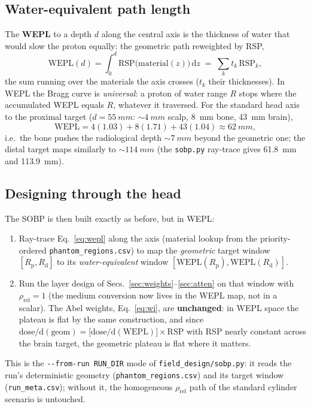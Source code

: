 \documentclass[11pt]{article}
\newcommand{\Rd}{R_{\mathrm d}}
\newcommand{\Rp}{R_{\mathrm p}}
\begin{document}
\subsection{Water-equivalent path length}
The \textbf{WEPL} to a depth $d$ along the central axis is the thickness of water
that would slow the proton equally: the geometric path reweighted by RSP,
\begin{equation}
\mathrm{WEPL}(d)=\int_0^{d}\mathrm{RSP}\big(\mathrm{material}(z)\big)\,\mathrm dz
\;=\;\sum_k t_k\,\mathrm{RSP}_k ,
\label{eq:wepl}
\end{equation}
the sum running over the materials the axis crosses ($t_k$ their thicknesses). In
WEPL the Bragg curve is \emph{universal}: a proton of water range $R$ stops where
the accumulated WEPL equals $R$, whatever it traversed. For the standard head axis
to the proximal target ($d=\SI{55}{mm}$: ${\sim}\SI{4}{mm}$ scalp, \SI{8}{mm}
bone, \SI{43}{mm} brain),
\[
\mathrm{WEPL}=4(1.03)+8(1.71)+43(1.04)\approx\SI{62}{mm},
\]
i.e.\ the bone pushes the radiological depth ${\sim}\SI{7}{mm}$ beyond the
geometric one; the distal target maps similarly to ${\sim}\SI{114}{mm}$ (the
\texttt{sobp.py} ray-trace gives \SI{61.8}{mm} and \SI{113.9}{mm}).

\subsection{Designing through the head}
The SOBP is then built exactly as before, but in WEPL:
\begin{enumerate}[nosep]
\item Ray-trace Eq.~\eqref{eq:wepl} along the axis (material lookup from the
priority-ordered \texttt{phantom\_regions.csv}) to map the \emph{geometric} target
window $[\Rp,\Rd]$ to its \emph{water-equivalent} window
$[\mathrm{WEPL}(\Rp),\mathrm{WEPL}(\Rd)]$.
\item Run the layer design of Secs.~\ref{sec:weights}--\ref{sec:atten} on that
window with $\rho_{\mathrm{rel}}=1$ (the medium conversion now lives in the WEPL
map, not in a scalar). The Abel weights, Eq.~\eqref{eq:wi}, are \textbf{unchanged}:
in WEPL space the plateau is flat by the same construction, and since
$\mathrm{dose}/\mathrm d(\text{geom})=\big[\mathrm{dose}/\mathrm d(\mathrm{WEPL})\big]
\times\mathrm{RSP}$ with RSP nearly constant across the brain target, the geometric
plateau is flat where it matters.
\end{enumerate}
This is the \texttt{-{}-from-run RUN\_DIR} mode of \texttt{field\_design/sobp.py}:
it reads the run's deterministic geometry (\texttt{phantom\_regions.csv}) and its
target window (\texttt{run\_meta.csv}); without it, the homogeneous
$\rho_{\mathrm{rel}}$ path of the standard cylinder scenario is untouched.
\end{document}
